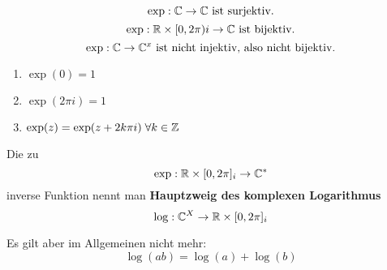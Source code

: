 \documentclass[main.tex]{subfiles}
\begin{document}
\begin{Bemerkung}[Folgerung]
  \begin{Theorem}
    $$\exp : \mathbb{C} \to \mathbb{C} \text{ ist surjektiv.}$$
    $$\exp : \mathbb{R} \times [0,2\pi)i \to \mathbb{C} \text{ ist bijektiv.}$$
    $$\exp : \mathbb{C} \to \mathbb{C}^x \text{ ist nicht injektiv, also nicht bijektiv.}$$
  \end{Theorem}
  \begin{Theorem}
    \begin{enumerate}
      \item $\exp(0) = 1$
      \item $\exp(2 \pi i) = 1$
      \item $\exp(z) = \exp(z + 2k\pi i) \;\forall k \in \mathbb{Z}$
    \end{enumerate}
  \end{Theorem}
  \begin{Theorem}
    Die zu
    $$\exp : \mathbb{R} \times [0,2\pi]_i \to \mathbb{C}^*$$
    inverse Funktion nennt man \textbf{Hauptzweig des komplexen Logarithmus}
    $$\log : \mathbb{C}^X \to \mathbb{R} \times [0,2\pi]_i$$
  \end{Theorem}
  \begin{Bemerkung}[Warnung]
    Es gilt aber im Allgemeinen nicht mehr:
    $$\log(ab) = \log(a) + \log(b)$$
  \end{Bemerkung}
\end{Bemerkung}
\end{document}
